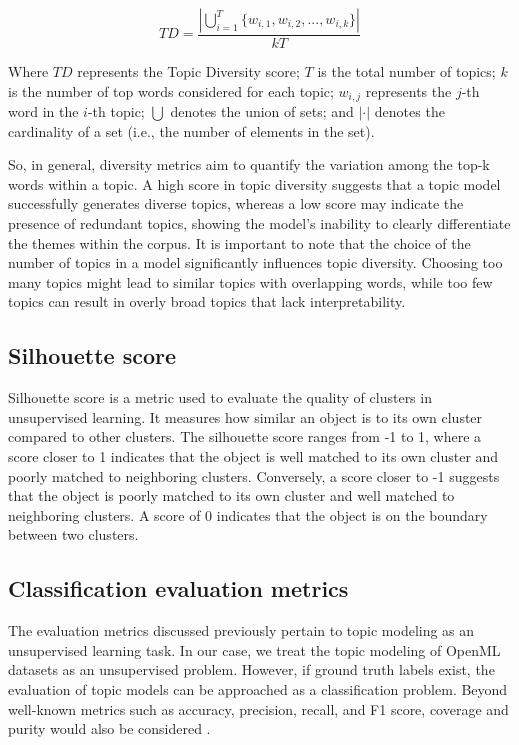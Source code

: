 \[TD = \frac{|\bigcup_{i=1}^{T} \{ w_{i,1}, w_{i,2}, ..., w_{i,k} \}|}{kT}\]

Where $TD$ represents the Topic Diversity score; $T$ is the total number of topics; $k$ is the number of top words considered for each topic; $w_{i,j}$ represents the $j$-th word in the $i$-th topic; $\bigcup$ denotes the union of sets; and $|\cdot|$ denotes the cardinality of a set (i.e., the number of elements in the set).

So, in general, diversity metrics aim to quantify the variation among the top-k words within a topic. A high score in topic diversity suggests that a topic model successfully generates diverse topics, whereas a low score may indicate the presence of redundant topics, showing the model's inability to clearly differentiate the themes within the corpus. It is important to note that the choice of the number of topics in a model significantly influences topic diversity. Choosing too many topics might lead to similar topics with overlapping words, while too few topics can result in overly broad topics that lack interpretability.

\subsection{Silhouette score}
\label{sec:silhouette_score}
Silhouette score \cite{shahapure_cluster_2020} is a metric used to evaluate the quality of clusters in unsupervised learning. It measures how similar an object is to its own cluster compared to other clusters. The silhouette score ranges from -1 to 1, where a score closer to 1 indicates that the object is well matched to its own cluster and poorly matched to neighboring clusters. Conversely, a score closer to -1 suggests that the object is poorly matched to its own cluster and well matched to neighboring clusters. A score of 0 indicates that the object is on the boundary between two clusters.

\subsection{Classification evaluation metrics}

The evaluation metrics discussed previously pertain to topic modeling as an unsupervised learning task. In our case, we treat the topic modeling of OpenML datasets as an unsupervised problem. However, if ground truth labels exist, the evaluation of topic models can be approached as a classification problem. Beyond well-known metrics such as accuracy, precision, recall, and F1 score, coverage and purity would also be considered \cite{churchill_evolution_2022}.

